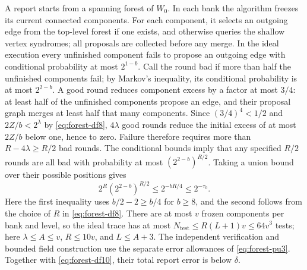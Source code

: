 \documentclass[11pt,letterpaper]{article}
\numberwithin{equation}{section}
\begin{document}
A report starts from a spanning forest of $W_0$.
In each bank the algorithm freezes its current connected components.
For each component, it selects an outgoing edge from the top-level forest if one exists, and otherwise queries the shallow vertex syndromes; all proposals are collected before any merge.
In the ideal execution every unfinished component fails to propose an outgoing edge with conditional probability at most $2^{1-b}$.
Call the round bad if more than half the unfinished components fail; by Markov's inequality, its conditional probability is at most $2^{2-b}$.
A good round reduces component excess by a factor at most $3/4$: at least half of the unfinished components propose an edge, and their proposal graph merges at least half that many components.
Since $(3/4)^4<1/2$ and $2Z/b<2^\lambda$ by \eqref{eq:forest-df8}, $4\lambda$ good rounds reduce the initial excess of at most $2Z/b$ below one, hence to zero.
Failure therefore requires more than $R-4\lambda\ge R/2$ bad rounds.
The conditional bounds imply that any specified $R/2$ rounds are all bad with probability at most $(2^{2-b})^{R/2}$.
Taking a union bound over their possible positions gives
\begin{equation}
2^R(2^{2-b})^{R/2}\le2^{-bR/4}\le2^{-\tau_0}.             \label{eq:forest-df10}
\end{equation}
Here the first inequality uses $b/2-2\ge b/4$ for $b\ge8$, and the second follows from the choice of $R$ in \eqref{eq:forest-df8}.
There are at most $v$ frozen components per bank and level, so the ideal trace has at most $N_{\mathrm{test}}\le R(L+1)v\le64v^3$ tests; here $\lambda\le A\le v$, $R\le10v$, and $L\le A+3$.
The independent verification and bounded field construction use the separate error allowances of \eqref{eq:forest-pu3}.
Together with \eqref{eq:forest-df10}, their total report error is below $\delta$.
\end{document}
